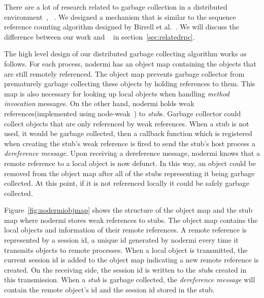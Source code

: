 There are a lot of research related to garbage collection in a distributed
environment~\cite{abdullahi1998garbage}, ~\cite{birrell1993distributed}.
We designed a mechanism that is similar to the sequence reference counting algorithm
designed by Birrell et al.~\cite{birrell1993distributed}.
We will discuss the difference between our work and ~\cite{birrell1993distributed}
in section~\ref{sec:relatedrpc}.

The high level design of our distributed garbage collecting
algorithm works as follows.
For each process, nodermi has an object map containing the objects
that are still remotely referenced.
The object map prevents garbage collector from prematurely garbage collecting
these objects by holding references to them.
This map is also necessary for looking up local objects
when handling \emph{method invocation} messages.
On the other hand, nodermi holds weak references(implemented using node-weak~\cite{nodeweak})
to \emph{stub}s.
Garbage collector could collect objects that are only
referenced by weak references.
When a stub is not used, it would be garbage collected,
then a callback function which is registered when creating
the stub's weak reference is fired to
send the stub's host process a \emph{dereference message}.
Upon receiving a dereference message,
nodermi knows that a remote reference to a local object
is now defunct.
In this way, an object could be removed from the object map after
all of the stubs representing it being garbage collected.
At this point, if it is not referenced locally it could
be safely garbage collected.


\nodrmiobjmapfig{}

Figure~\ref{fig:nodermiobjmap} shows the structure of
the object map and the stub map
where nodermi stores weak references to stubs.
The object map contains the local objects and information of
their remote references.
A remote reference is represented by a session id,
a unique id generated by nodermi every time it transmits objects
to remote processes.
When a local object is transmitted, the current session id is added to
the object map indicating a new remote reference is created.
On the receiving side, the session id is written to
the \emph{stub}s created in this transmission.
When a \emph{stub} is garbage collected,
the \emph{dereference message} will contain
the remote object's id and the session id stored
in the stub.


